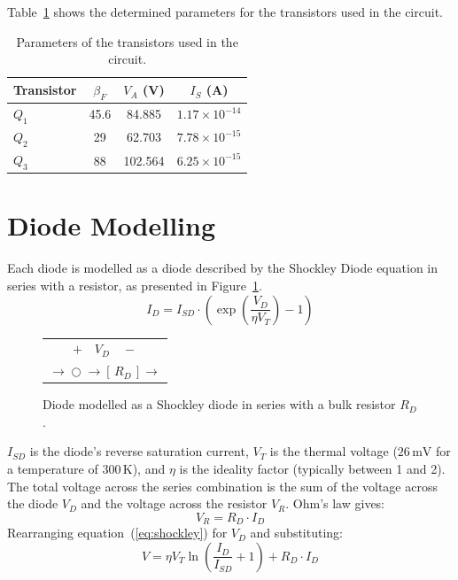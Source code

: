 \documentclass[12pt,a4paper]{article}
\begin{document}
Table~\ref{tab:params} shows the determined parameters for the transistors used in the circuit.

\begin{table}[H]
    \centering
    \begin{tabular}{lccc}
        \toprule
        Transistor & $\beta_F$ & $V_A$ (V) & $I_S$ (A) \\
        \midrule
        $Q_1$ & 45.6& 84.885& $1.17\times10^{-14}$\\
        $Q_2$ & 29& 62.703& $7.78\times10^{-15}$\\
        $Q_3$ & 88& 102.564& $6.25\times10^{-15}$\\
        \bottomrule
    \end{tabular}
    \caption{Parameters of the transistors used in the circuit.}
    \label{tab:params}
\end{table}

\section{Diode Modelling}

Each diode is modelled as a diode described by the Shockley Diode equation in series with a
resistor, as presented in Figure~\ref{fig:diode_model}.
\begin{equation}
    I_D = I_{SD} \cdot \left(\exp\!\left(\frac{V_D}{\eta V_T}\right) - 1\right)
    \label{eq:shockley}
\end{equation}

\begin{figure}[H]
    \centering
    \begin{tabular}{c}
        $+ \quad V_D \quad -$ \\[4pt]
        $\longrightarrow\!\!\!\!\bigcirc\!\!\!\!\longrightarrow\!\!\!\![\,R_D\,]\!\!\!\!\longrightarrow$
    \end{tabular}
    \caption{Diode modelled as a Shockley diode in series with a bulk resistor $R_D$.}
    \label{fig:diode_model}
\end{figure}

$I_{SD}$ is the diode's reverse saturation current, $V_T$ is the thermal voltage ($26\,\text{mV}$
for a temperature of $300\,\text{K}$), and $\eta$ is the ideality factor (typically between 1
and 2). The total voltage across the series combination is the sum of the voltage across the
diode $V_D$ and the voltage across the resistor $V_R$. Ohm's law gives:
\begin{equation}
    V_R = R_D \cdot I_D
    \label{eq:ohm}
\end{equation}
Rearranging equation~(\ref{eq:shockley}) for $V_D$ and substituting:
\begin{equation}
    V = \eta V_T \ln\!\left(\frac{I_D}{I_{SD}} + 1\right) + R_D \cdot I_D
    \label{eq:diode_model}
\end{equation}
\end{document}
